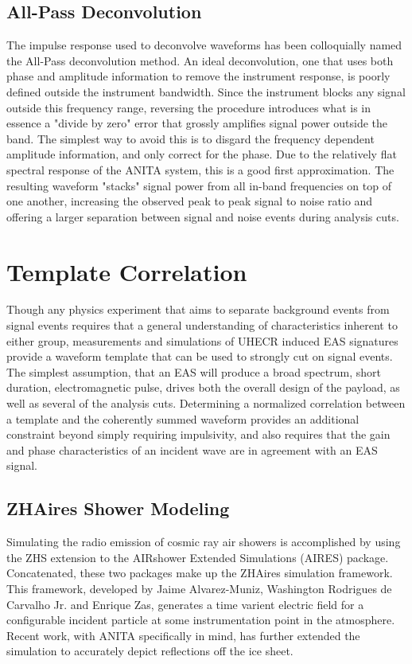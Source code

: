 		
	\subsection{All-Pass Deconvolution}
		The impulse response used to deconvolve waveforms has been colloquially named the All-Pass deconvolution method.  An ideal deconvolution, one that uses both phase and amplitude information to remove the instrument response, is poorly defined outside the instrument bandwidth.  Since the instrument blocks any signal outside this frequency range, reversing the procedure introduces what is in essence a "divide by zero" error that grossly amplifies signal power outside the band.  The simplest way to avoid this is to disgard the frequency dependent amplitude information, and only correct for the phase.  Due to the relatively flat spectral response of the ANITA system, this is a good first approximation.  The resulting waveform "stacks" signal power from all in-band frequencies on top of one another, increasing the observed peak to peak signal to noise ratio and offering a larger separation between signal and noise events during analysis cuts.



\section{Template Correlation}%
	Though any physics experiment that aims to separate background events from signal events requires that a general understanding of characteristics inherent to either group, measurements and simulations of UHECR induced EAS signatures provide a waveform template that can be used to strongly cut on signal events.  The simplest assumption, that an EAS will produce a broad spectrum, short duration, electromagnetic pulse, drives both the overall design of the payload, as well as several of the analysis cuts.  Determining a normalized correlation between a template and the coherently summed waveform provides an additional constraint beyond simply requiring impulsivity, and also requires that the gain and phase characteristics of an incident wave are in agreement with an EAS signal.

	\subsection{ZHAires Shower Modeling}
		Simulating the radio emission of cosmic ray air showers is accomplished by using the ZHS extension to the AIRshower Extended Simulations (AIRES) package.\cite{AlvarezMuñiz2012325}  Concatenated, these two packages make up the ZHAires simulation framework.  This framework, developed by Jaime Alvarez-Muniz, Washington Rodrigues de Carvalho Jr. and Enrique Zas, generates a time varient electric field for a configurable incident particle at some instrumentation point in the atmosphere.  Recent work, with ANITA specifically in mind, has further extended the simulation to accurately depict reflections off the ice sheet.
		
